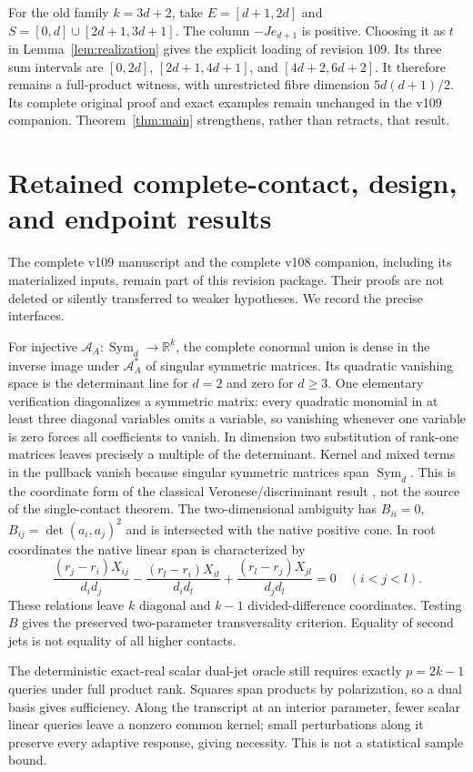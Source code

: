 \documentclass[11pt,reqno]{amsart}
\numberwithin{equation}{section}
\theoremstyle{definition}\newtheorem{definition}[theorem]{Definition}
\theoremstyle{remark}\newtheorem{remark}[theorem]{Remark}
\newcommand{\R}{\mathbb R}
\newcommand{\Sym}{\operatorname{Sym}}
\begin{document}
For the old family $k=3d+2$, take $E=[d+1,2d]$ and $S=[0,d]\cup[2d+1,3d+1]$. The column $-Je_{d+1}$ is positive. Choosing it as $t$ in Lemma~\ref{lem:realization} gives the explicit loading of revision 109. Its three sum intervals are $[0,2d]$, $[2d+1,4d+1]$, and $[4d+2,6d+2]$. It therefore remains a full-product witness, with unrestricted fibre dimension $5d(d+1)/2$. Its complete original proof and exact examples remain unchanged in the v109 companion. Theorem~\ref{thm:main} strengthens, rather than retracts, that result.

\section{Retained complete-contact, design, and endpoint results}
The complete v109 manuscript and the complete v108 companion, including its materialized inputs, remain part of this revision package. Their proofs are not deleted or silently transferred to weaker hypotheses. We record the precise interfaces.

For injective $\mathcal A_A:\Sym_d\to\R^k$, the complete conormal union is dense in the inverse image under $\mathcal A_A^*$ of singular symmetric matrices. Its quadratic vanishing space is the determinant line for $d=2$ and zero for $d\ge3$. One elementary verification diagonalizes a symmetric matrix: every quadratic monomial in at least three diagonal variables omits a variable, so vanishing whenever one variable is zero forces all coefficients to vanish. In dimension two substitution of rank-one matrices leaves precisely a multiple of the determinant. Kernel and mixed terms in the pullback vanish because singular symmetric matrices span $\Sym_d$. This is the coordinate form of the classical Veronese/discriminant result \cite{GKZ}, not the source of the single-contact theorem. The two-dimensional ambiguity has $B_{ii}=0$, $B_{ij}=\det(a_i,a_j)^2$ and is intersected with the native positive cone. In root coordinates the native linear span is characterized by
\[
 \frac{(r_j-r_i)X_{ij}}{d_id_j}
 -\frac{(r_l-r_i)X_{il}}{d_id_l}
 +\frac{(r_l-r_j)X_{jl}}{d_jd_l}=0\quad(i<j<l).
\]
These relations leave $k$ diagonal and $k-1$ divided-difference coordinates. Testing $B$ gives the preserved two-parameter transversality criterion. Equality of second jets is not equality of all higher contacts.

The deterministic exact-real scalar dual-jet oracle still requires exactly $p=2k-1$ queries under full product rank. Squares span products by polarization, so a dual basis gives sufficiency. Along the transcript at an interior parameter, fewer scalar linear queries leave a nonzero common kernel; small perturbations along it preserve every adaptive response, giving necessity. This is not a statistical sample bound.
\end{document}

